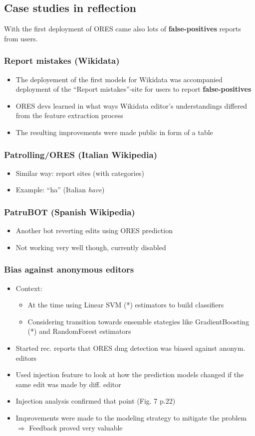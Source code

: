 \documentclass[12pt,a4paper]{article}
\begin{document}
\subsection{Case studies in reflection}
With the first deployment of ORES came also lots of \textbf{false-positives} reports from users.
\subsubsection{Report mistakes (Wikidata)}
\begin{itemize}
\item The deployement of the first models for Wikidata was accompanied deployment of the ``Report mistakes''-site for users to report \textbf{false-positives}
\item ORES devs learned in what ways Wikidata editor's understandings differed from the feature extraction process
\item The resulting improvements were made public in form of a table
\end{itemize}
\subsubsection{Patrolling/ORES (Italian Wikipedia)}
\begin{itemize}
\item Similar way: report sites (with categories)
\item Example: ``ha'' (Italian \textit{have})
\end{itemize}
\subsubsection{PatruBOT (Spanish Wikipedia)}
\begin{itemize}
\item Another bot reverting edits using ORES prediction
\item Not working very well though, currently disabled
\end{itemize}
\subsubsection{Bias against anonymous editors}
\begin{itemize}
\item Context:
\begin{itemize}
\item At the time using Linear SVM (*) estimators to build classifiers
\item Considering transition towards ensemble stategies like GradientBoosting (*) and RandomForest estimators
\end{itemize}
\item Started rec. reports that ORES dmg detection was biased against anonym. editors
\item Used injection feature to look at how the prediction models changed if the same edit was made by diff. editor
\item Injection analysis confirmed that point (Fig. 7 p.22)
\item Improvements were made to the modeling strategy to mitigate the problem
\(\Rightarrow\) Feedback proved very valuable
\end{itemize}
\end{document}
